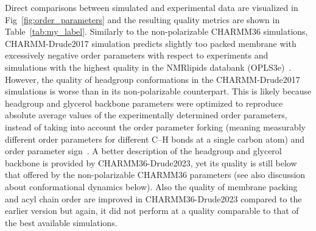\documentclass[journal=jacsat,manuscript=article,layout=singlecolumn]{achemso}
\begin{document}
Direct comparisons between simulated and experimental data are visualized in Fig~\ref{fig:order_parameters} and the resulting quality metrics are shown in Table~\ref{tab:my_label}. Similarly to the non-polarizable CHARMM36 simulations, CHARMM-Drude2017 simulation predicts slightly too packed membrane with excessively negative order parameters with respect to experiments and simulations with the highest quality in the NMRlipids databank (OPLS3e)~\cite{Databank}. However,
the quality of headgroup conformations in the CHARMM-Drude2017 simulations is worse than in its non-polarizable counterpart. This is likely because headgroup and glycerol backbone parameters were optimized to reproduce absolute average values of the experimentally determined order parameters, instead of taking into account the order parameter forking (meaning measurably different order parameters for different C--H bonds at a single carbon atom) and order parameter sign~\cite{Antila2022}. A better description of the headgroup and glycerol backbone is provided by CHARMM36-Drude2023, yet its quality is still below that offered by the non-polarizable CHARMM36 parameters (see also discussion about conformational dynamics below). Also the quality of membrane packing and acyl chain order are improved in CHARMM36-Drude2023 compared to the earlier version but again, it did not perform at a quality comparable to that of the best available simulations.
\end{document}
